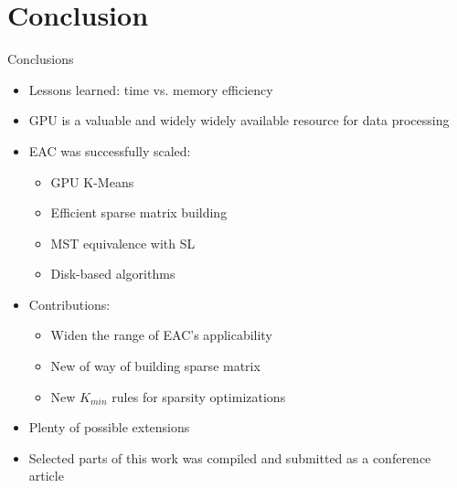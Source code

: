 
\section{Conclusion}

\begin{frame}{Conclusions}
\begin{itemize}
\item Lessons learned: time vs. memory efficiency
\item GPU is a valuable and widely widely available resource for data processing
\item EAC was successfully scaled:
	\begin{itemize}
	\item GPU K-Means
	\item Efficient sparse matrix building
	\item MST equivalence with SL
	\item Disk-based algorithms
	\end{itemize}

\item Contributions:
	\begin{itemize}
	\item Widen the range of EAC's applicability 
	\item New of way of building sparse matrix
	\item New $K_{min}$ rules for sparsity optimizations
	\end{itemize}

\item Plenty of possible extensions

\item Selected parts of this work was compiled and submitted as a conference article

\end{itemize}
\end{frame}

